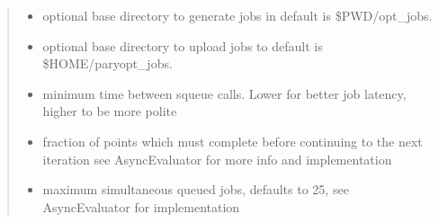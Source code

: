 \documentclass[letterpaper,12pt,english]{sphinxmanual}
\begin{document}
\begin{fulllineitems}
\begin{quote}
\begin{description}
\begin{itemize}
\item {} 
\sphinxAtStartPar
{} \textendash{} optional base directory to generate jobs in \sphinxhyphen{} default is \$PWD/opt\_jobs.

\item {} 
\sphinxAtStartPar
{} \textendash{} optional base directory to upload jobs to \sphinxhyphen{} default is \$HOME/paryopt\_jobs.

\item {} 
\sphinxAtStartPar
{} \textendash{} minimum time between squeue calls. Lower for better job latency, higher to be more     polite

\item {} 
\sphinxAtStartPar
{} \textendash{} fraction of points which must complete before continuing to the next iteration see     AsyncEvaluator for more info and implementation

\item {} 
\sphinxAtStartPar
{} \textendash{} maximum simultaneous queued jobs, defaults to 25, see AsyncEvaluator for implementation

\end{itemize}

\end{description}\end{quote}


\end{fulllineitems}
\end{document}
